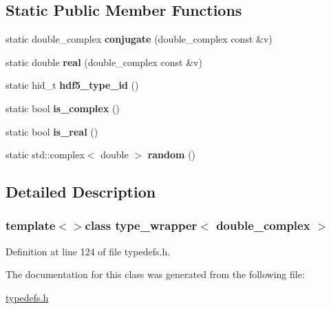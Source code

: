 \subsection*{Static Public Member Functions}
\begin{DoxyCompactItemize}
\item 
\hypertarget{classtype__wrapper_3_01double__complex_01_4_a0ea003debe3d46e5c816367142c0035a}{}static double\+\_\+complex {\bfseries conjugate} (double\+\_\+complex const \&v)\label{classtype__wrapper_3_01double__complex_01_4_a0ea003debe3d46e5c816367142c0035a}

\item 
\hypertarget{classtype__wrapper_3_01double__complex_01_4_a6508007d9663497ed23f1ccbeea43f26}{}static double {\bfseries real} (double\+\_\+complex const \&v)\label{classtype__wrapper_3_01double__complex_01_4_a6508007d9663497ed23f1ccbeea43f26}

\item 
\hypertarget{classtype__wrapper_3_01double__complex_01_4_ab0138818069cd1c9439760e604430519}{}static hid\+\_\+t {\bfseries hdf5\+\_\+type\+\_\+id} ()\label{classtype__wrapper_3_01double__complex_01_4_ab0138818069cd1c9439760e604430519}

\item 
\hypertarget{classtype__wrapper_3_01double__complex_01_4_ab4cee688430dfaa1149c910c2a19556d}{}static bool {\bfseries is\+\_\+complex} ()\label{classtype__wrapper_3_01double__complex_01_4_ab4cee688430dfaa1149c910c2a19556d}

\item 
\hypertarget{classtype__wrapper_3_01double__complex_01_4_a43d69f28b95ae21c51d334a4e8ea1606}{}static bool {\bfseries is\+\_\+real} ()\label{classtype__wrapper_3_01double__complex_01_4_a43d69f28b95ae21c51d334a4e8ea1606}

\item 
\hypertarget{classtype__wrapper_3_01double__complex_01_4_aacb7bac5ce7801c03c2abb9aa9f321ae}{}static std\+::complex$<$ double $>$ {\bfseries random} ()\label{classtype__wrapper_3_01double__complex_01_4_aacb7bac5ce7801c03c2abb9aa9f321ae}

\end{DoxyCompactItemize}


\subsection{Detailed Description}
\subsubsection*{template$<$$>$class type\+\_\+wrapper$<$ double\+\_\+complex $>$}



Definition at line 124 of file typedefs.\+h.



The documentation for this class was generated from the following file\+:\begin{DoxyCompactItemize}
\item 
\hyperlink{typedefs_8h}{typedefs.\+h}\end{DoxyCompactItemize}
